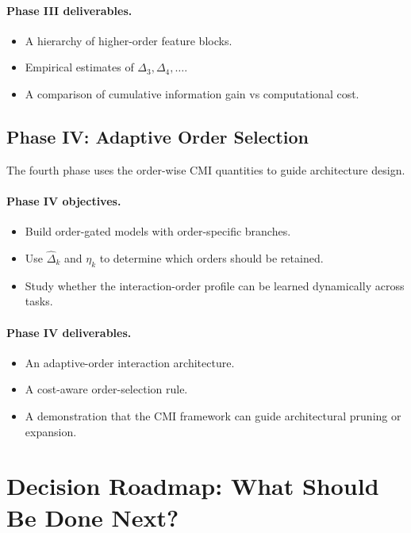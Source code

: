 \documentclass[11pt]{article}
\newcommand{\1}{\mathbf{1}}
\begin{document}
\paragraph{Phase III deliverables.}
\begin{itemize}[leftmargin=1.5em]
    \item A hierarchy of higher-order feature blocks.
    \item Empirical estimates of $\Delta_3,\Delta_4,\ldots$.
    \item A comparison of cumulative information gain vs computational cost.
\end{itemize}

\subsection{Phase IV: Adaptive Order Selection}

The fourth phase uses the order-wise CMI quantities to guide architecture design.

\paragraph{Phase IV objectives.}
\begin{itemize}[leftmargin=1.5em]
    \item Build order-gated models with order-specific branches.
    \item Use $\widehat{\Delta}_k$ and $\eta_k$ to determine which orders should be retained.
    \item Study whether the interaction-order profile can be learned dynamically across tasks.
\end{itemize}

\paragraph{Phase IV deliverables.}
\begin{itemize}[leftmargin=1.5em]
    \item An adaptive-order interaction architecture.
    \item A cost-aware order-selection rule.
    \item A demonstration that the CMI framework can guide architectural pruning or expansion.
\end{itemize}

\section{Decision Roadmap: What Should Be Done Next?}
\end{document}
